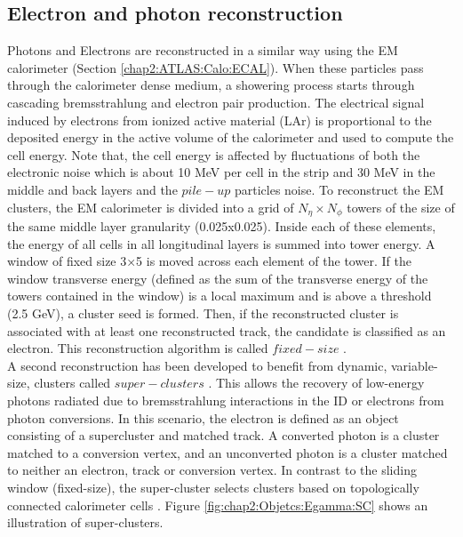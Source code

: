 \subsection{Electron and photon reconstruction}
\label{chap2:Objects:Egamma}
Photons and Electrons are reconstructed in a similar way using the EM calorimeter (Section \ref{chap2:ATLAS:Calo:ECAL}). When these particles pass through the calorimeter dense medium, a showering process starts through cascading bremsstrahlung and electron pair production. The electrical signal induced by electrons from ionized active material (LAr) is proportional to the deposited energy in the active volume of the calorimeter and used to compute the cell energy. Note that, the cell energy is affected by fluctuations of both the electronic noise which is about 10 MeV per cell in the strip and 30 MeV in the middle and back layers and the $pile-up$ particles noise. To reconstruct the EM clusters, the EM calorimeter is divided into a grid of $N_\eta\times N_\phi$ towers of the size of the same middle layer granularity (0.025x0.025). Inside each of these elements, the energy of all cells in all longitudinal layers is summed into tower energy. A window of fixed size 3×5 is moved across each element of the tower. If the window transverse energy \eT (defined as the sum of the transverse energy of the towers contained in the window) is a local maximum and is above a threshold (2.5 GeV), a cluster seed is formed. Then, if the reconstructed cluster is associated with at least one reconstructed track, the candidate is classified as an electron. This reconstruction algorithm is called $fixed-size$ \cite{Fixed_size_cluster}. \\
A second reconstruction has been developed to benefit from dynamic, variable-size, clusters called $super-clusters$ \cite{Egamma_Perf_run2}. This allows the recovery of low-energy photons radiated due to bremsstrahlung interactions in the ID or electrons from photon conversions. In this scenario, the electron is defined as an object consisting of a supercluster and matched track. A converted photon is a cluster matched to a conversion vertex, and an unconverted photon is a cluster matched to neither an electron, track or conversion vertex. In contrast to the sliding window (fixed-size), the super-cluster selects clusters based on topologically connected calorimeter cells \cite{Topo_cluster}. Figure \ref{fig:chap2:Objetcs:Egamma:SC} shows an illustration of super-clusters.  
